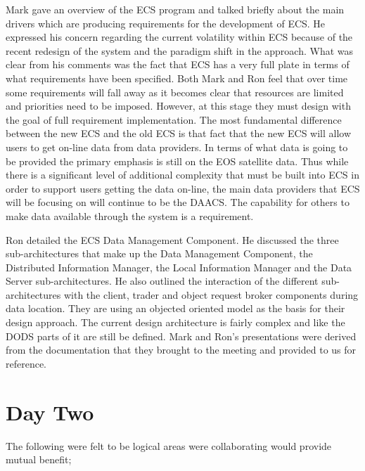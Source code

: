        Mark gave an overview of the ECS program and talked briefly about the
main drivers which are producing requirements for the development of ECS.  He
expressed his concern regarding the current volatility within ECS because of
the recent redesign of the system and the paradigm shift in the approach.
What was clear from his comments was the fact that ECS has a very full plate
in terms of what requirements have been specified.  Both Mark and Ron feel
that over time some requirements will fall away as it becomes clear that
resources are limited and priorities need to be imposed.  However, at this
stage they must design with the goal of full requirement implementation.  The
most fundamental difference between the new ECS and the old ECS is that fact
that the new ECS will allow users to get on-line data from data providers.
In terms of what data is going to be provided the primary emphasis is still
on the EOS satellite data.  Thus while there is a significant level of
additional complexity that must be built into ECS in order to support users
getting the data on-line, the main data providers that ECS will be focusing
on will continue to be the DAACS.  The capability for others to make data
available through the system is a requirement.  

    Ron detailed the ECS Data Management Component.  He discussed the
three sub-architectures that make up the Data Management Component, the
Distributed Information Manager, the Local Information Manager and the Data
Server sub-architectures.  He also outlined the interaction of the different
sub-architectures with the client, trader and object request broker components
during data location.  They are using an objected oriented model as the
basis for their design approach.  The current design architecture is fairly
complex and like the DODS parts of it are still be defined.  Mark and Ron's
presentations were derived from the documentation that they brought to the
meeting and provided to us for reference.

\section{Day Two}

      The following were felt to be logical areas were collaborating would
provide mutual benefit;

